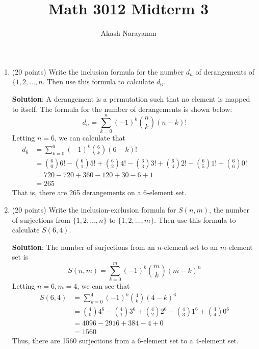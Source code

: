 \documentclass[12pt]{article}
\title{Math 3012 Midterm 3}
\author{Akash Narayanan}
\newenvironment{solution}{
\begin{mdframed}
  { {\bfseries Solution}: }}{
\end{mdframed}}
\begin{document}
  \maketitle

  \begin{enumerate}
    \item (20 points) Write the inclusion formula for the number \(d_{n}\) of derangements of \(\{1, 2,\ldots, n\). Then use this formula to calculate \(d_{6}\).

    \begin{solution}
      A derangement is a permutation such that no element is mapped to itself. The formula for the number of derangements is shown below:
      \begin{equation*}
        d_{n} = \sum_{k=0}^{n} (-1)^{k} {n \choose k} (n-k)!
      \end{equation*}
      Letting \(n = 6\), we can calculate that
      \begin{align*}
        d_{6} &= \sum_{k=0}^{6} (-1)^{k} {6 \choose k} (6-k)! \\
              &= {6 \choose 0} 6! - {6 \choose 1} 5! + {6 \choose 2} 4! - {6 \choose 3} 3! + {6 \choose 4} 2! - {6 \choose 5} 1! + {6 \choose 6} 0! \\
              &= 720 - 720 + 360 - 120 + 30 - 6 + 1 \\
              &= 265
      \end{align*}
      That is, there are 265 derangements on a 6-element set.
    \end{solution}

    \pagebreak

    \item (20 points) Write the inclusion-exclusion formula for \(S(n, m)\), the number of surjections from \(\{1, 2, \ldots, n\}\) to \(\{1, 2, \ldots, m\}\). Then use this formula to calculate \(S(6, 4)\).

    \begin{solution}
      The number of surjections from an \(n\)-element set to an \(m\)-element set is
      \begin{equation*}
        S(n, m) = \sum_{k=0}^{m} (-1)^{k} {m \choose k} (m-k)^{n}
      \end{equation*}
      Letting \(n=6, m=4\), we can see that
      \begin{align*}
        S(6, 4) &= \sum_{k=0}^{4} (-1)^{k} {4 \choose k} (4-k)^{6} \\
                &= {4 \choose 0} 4^{6} - {4 \choose 1} 3^{6} + {4 \choose 2} 2^{6} - {4 \choose 3} 1^{6} + {4 \choose 4} 0^{6} \\
                &= 4096 - 2916 + 384 - 4 + 0 \\
                &= 1560
      \end{align*}
      Thus, there are 1560 surjections from a 6-element set to a 4-element set.
    \end{solution}


\end{enumerate}
\end{document}
